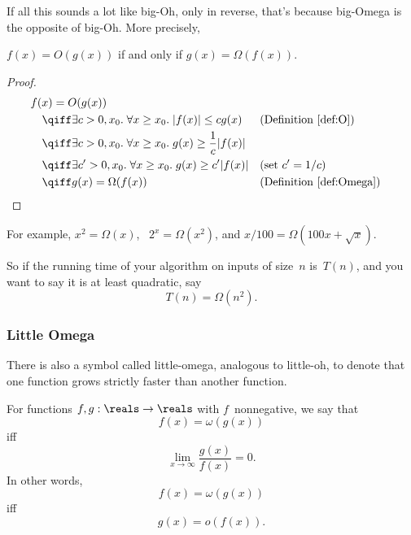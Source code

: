 If all this sounds a lot like big-Oh, only in reverse, that's because
big-Omega is the opposite of big-Oh.  More precisely,

\begin{theorem}\label{thm:9S2}
$f(x) = O(g(x))$ if and only if $g(x) = \Omega(f(x))$.
\end{theorem}

\begin{proof}
\begin{align*}
\lefteqn{f(x) = O(g(x))} \quad&\\
   & \qiff \exists c > 0, x_0. \; \forall x \ge x_0. \;
            |f(x)| \le c g(x) 
        && \text{(Definition~\ref{def:O})} \\
    & \qiff \exists c > 0, x_0. \; \forall x \ge x_0. \;
            g(x) \ge \frac{1}{c} |f(x)| \\
    & \qiff \exists c' > 0, x_0. \; \forall x \ge x_0. \;
            g(x) \ge c' |f(x)|
        && \text{(set $c' = 1/c$)} \\
    & \qiff g(x) = \Omega(f(x))
        && \text{(Definition~\ref{def:Omega})}
\qedhere
\end{align*}
\end{proof}

For example, $x^2 = \Omega(x)$, \ $2^x = \Omega(x^2)$, and $x/100 =
\Omega(100 x + \sqrt{x})$.

So if the running time of your algorithm on inputs of size~$n$
is~$T(n)$, and you want to say it is at least quadratic, say
\begin{equation*}
    T(n) = \Omega(n^2).
\end{equation*}

\subsubsection{Little Omega}

There is also a symbol called little-omega, analogous to little-oh, to
denote that one function grows strictly faster than another function.

\begin{definition}\label{def:omega}
For functions $f, g: \reals \to \reals$ with $f$~nonnegative, we say
that
\begin{equation*}
    f(x) = \omega(g(x))
\end{equation*}
iff
\begin{equation*}
    \lim_{x \to \infty} \frac{g(x)}{f(x)} = 0.
\end{equation*}
In other words,
\begin{equation*}
    f(x) = \omega(g(x))
\end{equation*}
iff
\begin{equation*}
    g(x) = o(f(x)).
\end{equation*}
\end{definition}

